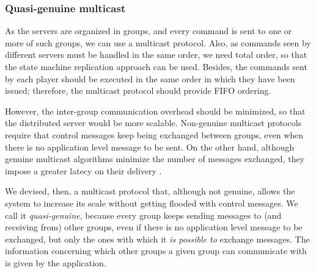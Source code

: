 \documentclass[]{usiinfprospectus}
\begin{document}
%



\subsubsection{Quasi-genuine multicast} \label{sec:optmcast}

As the servers are organized in groups, and every command is sent to one or more of such groups, we can use a multicast protocol. Also, as commands seen by different servers must be handled in the same order, we need total order, so that the state machine replication approach can be used. Besides, the commands sent by each player should be executed in the same order in which they have been issued; therefore, the multicast protocol should provide FIFO ordering.

However, the inter-group communication overhead should be minimized, so that the distributed server would be more scalable. Non-genuine multicast protocols \cite{schiper2009gng} require that control messages keep being exchanged between groups, even when there is no application level message to be sent. On the other hand, although genuine multicast algorithms minimize the number of messages exchanged, they impose a greater latecy on their delivery \cite{schiper2008ica}.

We devised, then, a multicast protocol that, although not genuine, allows the system to increase its scale without getting flooded with control messages. We call it \emph{quasi-genuine}, because every group keeps sending messages to (and receiving from) other groups, even if there is no application level message to be exchanged, but only the ones with which it \emph{is possible to} exchange messages. The information concerning which other groups a given group can communicate with is given by the application.
\end{document}
